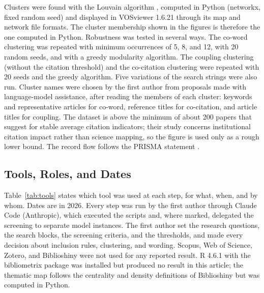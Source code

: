 Clusters were found with the Louvain algorithm \parencite{blondel2008}, computed in Python (networkx, fixed random seed) and displayed in VOSviewer 1.6.21 \parencite{vaneck2010} through its map and network file formats. The cluster membership shown in the figures is therefore the one computed in Python. Robustness was tested in several ways. The co-word clustering was repeated with minimum occurrences of 5, 8, and 12, with 20 random seeds, and with a greedy modularity algorithm. The coupling clustering (without the citation threshold) and the co-citation clustering were repeated with 20 seeds and the greedy algorithm. Five variations of the search strings were also run. Cluster names were chosen by the first author from proposals made with language-model assistance, after reading the members of each cluster: keywords and representative articles for co-word, reference titles for co-citation, and article titles for coupling. The dataset is above the minimum of about 200 papers that \textcite{rogers2020} suggest for stable average citation indicators; their study concerns institutional citation impact rather than science mapping, so the figure is used only as a rough lower bound. The record flow follows the PRISMA statement \parencite{page2021}.

\subsection{Tools, Roles, and Dates}
Table~\ref{tab:tools} states which tool was used at each step, for what, when, and by whom. Dates are in 2026. Every step was run by the first author through Claude Code (Anthropic), which executed the scripts and, where marked, delegated the screening to separate model instances. The first author set the research questions, the search blocks, the screening criteria, and the thresholds, and made every decision about inclusion rules, clustering, and wording. Scopus, Web of Science, Zotero, and Biblioshiny were not used for any reported result. R 4.6.1 with the bibliometrix package was installed but produced no result in this article; the thematic map follows the centrality and density definitions of Biblioshiny but was computed in Python.


